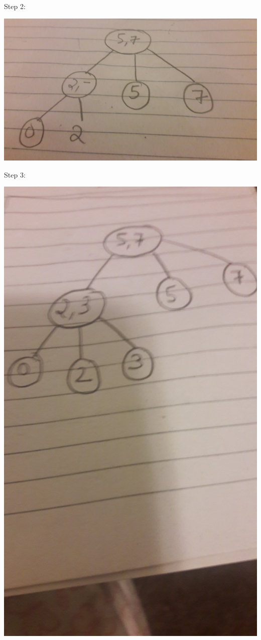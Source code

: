 \documentclass{article}
\begin{document}
Step 2:



\includegraphics[scale=0.1]{20.jpg}



Step 3:



\includegraphics[scale=0.1]{21.jpg}
\end{document}
